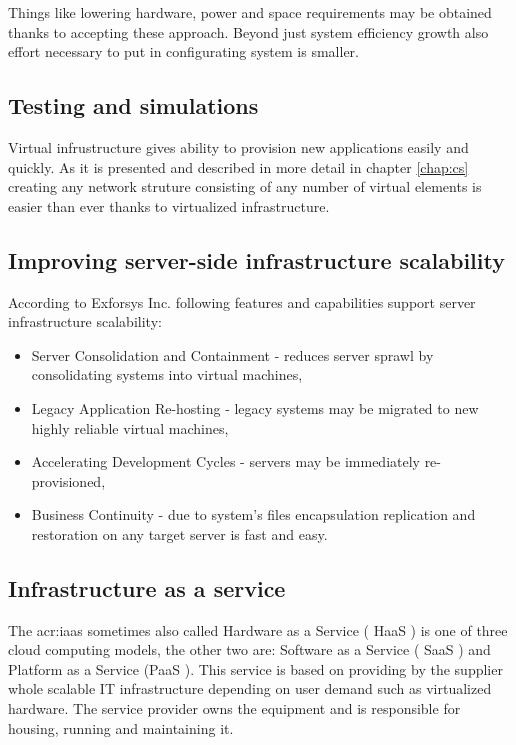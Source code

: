 \documentclass[11pt]{book}
\begin{document}
	Things like lowering hardware, power and space requirements may be obtained thanks to accepting these 
	approach. Beyond just system efficiency growth also effort necessary to put in configurating system is smaller. 

      \subsection{Testing and simulations}

	Virtual infrustructure gives ability to provision new applications easily and quickly. As it is presented and described in more
	detail in chapter \ref{chap:cs} creating any network struture consisting of any number of virtual elements is easier than ever 
	thanks to virtualized infrastructure. 

      \subsection{Improving server-side infrastructure scalability}


	According to Exforsys Inc. following features and capabilities support server infrastructure scalability:
	
	\begin{itemize}
		\item{Server Consolidation and Containment  - reduces  server sprawl by 
			consolidating systems into virtual machines,}
		\item{Legacy Application Re-hosting - legacy systems may be migrated to new highly reliable virtual machines,}
		\item{Accelerating Development Cycles - servers may be immediately re-provisioned,}
		\item{Business Continuity - due to system's files encapsulation replication 
			and restoration on any target server is fast and easy. \cite{vib}}
	\end{itemize}

      \subsection{Infrastructure as a service}

        The \gls{acr:iaas} sometimes also called Hardware as a Service ( HaaS ) is one of three cloud
        computing models, the other two are: Software as a Service ( SaaS ) and Platform as a Service  (PaaS ).  This
        service is based on providing by the supplier whole scalable IT infrastructure depending on user demand such as
        virtualized hardware. The service provider owns the equipment and is responsible for housing, running and
        maintaining it.
\end{document}
